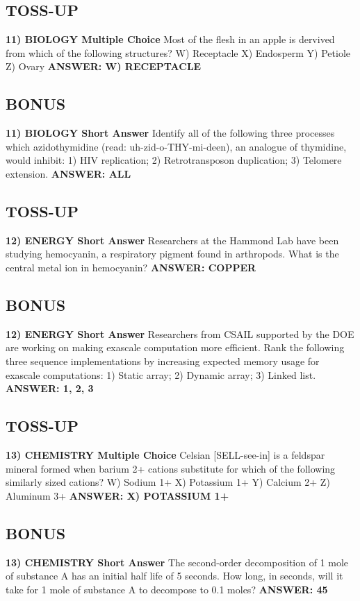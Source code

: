 \documentclass{article}
\begin{document}
\subsection*{TOSS-UP}
\textbf{11) BIOLOGY Multiple Choice} Most of the flesh in an apple is dervived from which of the following structures?
W) Receptacle
X) Endosperm
Y) Petiole
Z) Ovary
\textbf{ANSWER: W) RECEPTACLE}

\subsection*{BONUS}
\textbf{11) BIOLOGY Short Answer} Identify all of the following three processes which azidothymidine (read: uh-zid-o-THY-mi-deen), an analogue of thymidine, would inhibit: 1) HIV replication; 2) Retrotransposon duplication; 3) Telomere extension.
\textbf{ANSWER: ALL}

\newpage

\subsection*{TOSS-UP}
\textbf{12) ENERGY Short Answer} Researchers at the Hammond Lab have been studying hemocyanin, a respiratory pigment found in arthropods. What is the central metal ion in hemocyanin?
\textbf{ANSWER: COPPER}

\subsection*{BONUS}
\textbf{12) ENERGY Short Answer} Researchers from CSAIL supported by the DOE are working on making exascale computation more efficient. Rank the following three sequence implementations by increasing expected memory usage for exascale computations: 1) Static array; 2) Dynamic array; 3) Linked list.
\textbf{ANSWER: 1, 2, 3}

\subsection*{TOSS-UP}
\textbf{13) CHEMISTRY Multiple Choice} Celsian [SELL-see-in] is a feldspar mineral formed when barium 2+ cations substitute for which of the following similarly sized cations?
W) Sodium 1+
X) Potassium 1+
Y) Calcium 2+
Z) Aluminum 3+
\textbf{ANSWER: X) POTASSIUM 1+}

\subsection*{BONUS}
\textbf{13) CHEMISTRY Short Answer} The second-order decomposition of 1 mole of substance A has an initial half life of 5 seconds. How long, in seconds, will it take for 1 mole of substance A to decompose to 0.1 moles?
\textbf{ANSWER: 45}
\end{document}
